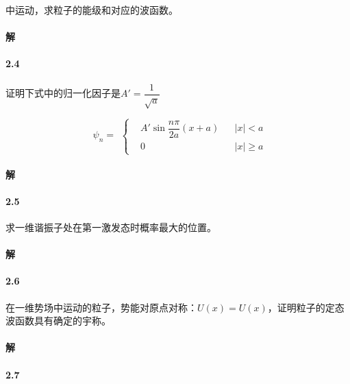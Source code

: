 \documentclass{article}
\begin{document}
中运动，求粒子的能级和对应的波函数。

\paragraph{解}

\paragraph{2.4}

证明下式中的归一化因子是$A'=\dfrac{1}{\sqrt{a}} $

\begin{equation*}
  \begin{aligned}
    \psi_n =
  \end{aligned}
  \left\{
  \begin{aligned}
    & A' \sin \dfrac{n\pi}{2a} \left( x + a \right) && \left| x \right| < a \\
    & 0 && \left| x \right| \geq a
  \end{aligned}
  \right.
\end{equation*}

\paragraph{解}

\paragraph{2.5}

求一维谐振子处在第一激发态时概率最大的位置。

\paragraph{解}

\paragraph{2.6}

在一维势场中运动的粒子，势能对原点对称：$U \left( x \right) = U \left( x \right)$，证明粒子的定态波函数具有确定的宇称。

\paragraph{解}

\paragraph{2.7}
\end{document}
